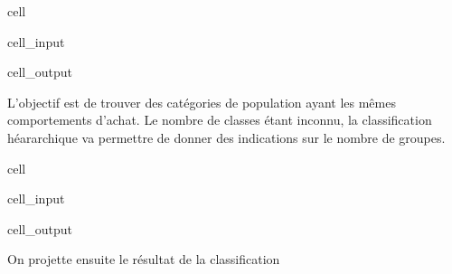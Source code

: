 \documentclass[letterpaper,10pt,french]{sphinxmanual}
\begin{document}
\begin{sphinxuseclass}{cell}
\begin{sphinxuseclass}{cell_input}
\end{sphinxuseclass}
\begin{sphinxuseclass}{cell_output}
\noindent{}

\end{sphinxuseclass}
\end{sphinxuseclass}
\sphinxAtStartPar
L’objectif est de trouver des catégories de population ayant les mêmes comportements d’achat. Le nombre de classes étant inconnu, la classification héararchique va permettre de donner des indications sur le nombre de groupes.

\begin{sphinxuseclass}{cell}
\begin{sphinxuseclass}{cell_input}
\begin{sphinxVerbatim}[commandchars=\\\{\}]
   

  \PYG{p}{[}\PYG{p}{[}\PYG{p}{]}\PYG{p}{]}
     
\end{sphinxVerbatim}

\end{sphinxuseclass}
\begin{sphinxuseclass}{cell_output}
\noindent{}

\end{sphinxuseclass}
\end{sphinxuseclass}
\sphinxAtStartPar
On projette ensuite le résultat de la classification
\end{document}
